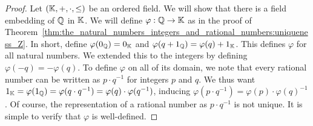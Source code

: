 \documentclass[../main.tex]{subfiles}
\begin{document}
\begin{proof}
    Let $(\mathbb{K},+,\cdot,\leq)$ be an ordered field. We will show that there is a field embedding of $\mathbb{Q}$ in $\mathbb{K}$. We will define $\varphi:\mathbb{Q}\to\mathbb{K}$ as in the proof of Theorem~\ref{thm:the_natural_numbers_integers_and_rational_numbers:uniqueness_Z}. In short, define $\varphi(0_{\mathbb{Q}})=0_{\mathbb{K}}$ and $\varphi(q+1_{\mathbb{Q}})=\varphi(q)+1_{\mathbb{K}}$. This defines $\varphi$ for all natural numbers. We extended this to the integers by defining $\varphi(-q)=-\varphi(q)$. To define $\varphi$ on all of its domain, we note that every rational number can be written as $p\cdot q^{-1}$ for integers $p$ and $q$. We thus want $1_{\mathbb{K}}=\varphi(1_{\mathbb{Q}})=\varphi(q\cdot q^{-1})=\varphi(q)\cdot\varphi(q^{-1})$, inducing $\varphi(p\cdot q^{-1})=\varphi(p)\cdot\varphi(q)^{-1}$. Of course, the representation of a rational number as $p\cdot q^{-1}$ is not unique. It is simple to verify that $\varphi$ is well-defined.


\end{proof}
\end{document}
